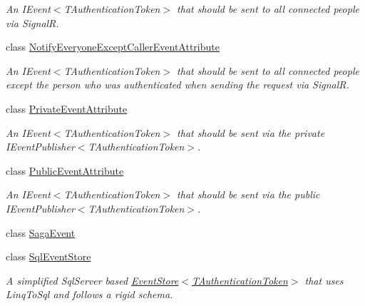 \begin{DoxyCompactItemize}
\begin{DoxyCompactList}\small\item\em An I\+Event$<$\+T\+Authentication\+Token$>$ that should be sent to all connected people via SignalR. \end{DoxyCompactList}\item 
class \hyperlink{classCqrs_1_1Events_1_1NotifyEveryoneExceptCallerEventAttribute}{Notify\+Everyone\+Except\+Caller\+Event\+Attribute}
\begin{DoxyCompactList}\small\item\em An I\+Event$<$\+T\+Authentication\+Token$>$ that should be sent to all connected people except the person who was authenticated when sending the request via SignalR. \end{DoxyCompactList}\item 
class \hyperlink{classCqrs_1_1Events_1_1PrivateEventAttribute}{Private\+Event\+Attribute}
\begin{DoxyCompactList}\small\item\em An I\+Event$<$\+T\+Authentication\+Token$>$ that should be sent via the private I\+Event\+Publisher$<$\+T\+Authentication\+Token$>$. \end{DoxyCompactList}\item 
class \hyperlink{classCqrs_1_1Events_1_1PublicEventAttribute}{Public\+Event\+Attribute}
\begin{DoxyCompactList}\small\item\em An I\+Event$<$\+T\+Authentication\+Token$>$ that should be sent via the public I\+Event\+Publisher$<$\+T\+Authentication\+Token$>$. \end{DoxyCompactList}\item 
class \hyperlink{classCqrs_1_1Events_1_1SagaEvent}{Saga\+Event}
\item 
class \hyperlink{classCqrs_1_1Events_1_1SqlEventStore}{Sql\+Event\+Store}
\begin{DoxyCompactList}\small\item\em A simplified Sql\+Server based \hyperlink{classCqrs_1_1Events_1_1EventStore_a6346cb2aea4c5b4e740dc6cfb15abab8}{Event\+Store$<$\+T\+Authentication\+Token$>$} that uses Linq\+To\+Sql and follows a rigid schema. \end{DoxyCompactList}\end{DoxyCompactItemize}
